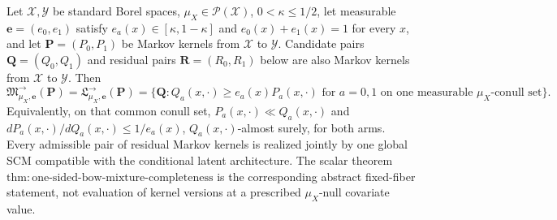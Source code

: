 Let \(\mathcal X,\mathcal Y\) be standard Borel spaces, \(\mu_X\in\mathcal P(\mathcal X)\), \(0<\kappa\le1/2\), let measurable \(\boldsymbol e=(e_0,e_1)\) satisfy \(e_a(x)\in[\kappa,1-\kappa]\) and \(e_0(x)+e_1(x)=1\) for every \(x\), and let \(\boldsymbol P=(P_0,P_1)\) be Markov kernels from \(\mathcal X\) to \(\mathcal Y\).  Candidate pairs \(\boldsymbol Q=(Q_0,Q_1)\) and residual pairs \(\boldsymbol R=(R_0,R_1)\) below are also Markov kernels from \(\mathcal X\) to \(\mathcal Y\).  Then
\[
 \mathfrak M^{\to}_{\mu_X,\boldsymbol e}(\boldsymbol P)
 =\mathfrak L^{\to}_{\mu_X,\boldsymbol e}(\boldsymbol P)
 =\{\boldsymbol Q:Q_a(x,\cdot)\ge e_a(x)P_a(x,\cdot)\text{ for }a=0,1\text{ on one measurable }\mu_X\text{-conull set}\}.
\]
Equivalently, on that common conull set, \(P_a(x,\cdot)\ll Q_a(x,\cdot)\) and \(dP_a(x,\cdot)/dQ_a(x,\cdot)\le1/e_a(x)\), \(Q_a(x,\cdot)\)-almost surely, for both arms.  Every admissible pair of residual Markov kernels is realized jointly by one global SCM compatible with the conditional latent architecture.  The scalar theorem \(\mathrm{thm:one\text{-}sided\text{-}bow\text{-}mixture\text{-}completeness}\) is the corresponding abstract fixed-fiber statement, not evaluation of kernel versions at a prescribed \(\mu_X\)-null covariate value.